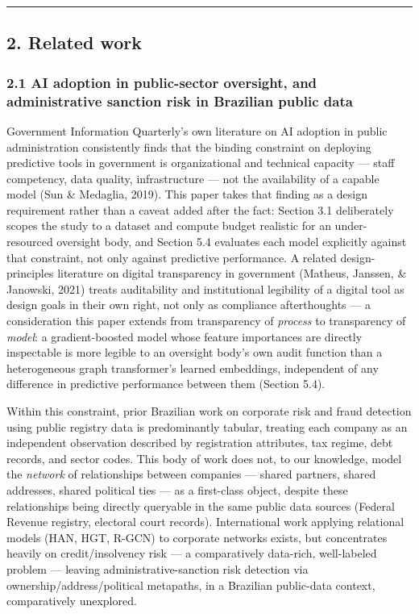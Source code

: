 \documentclass[11pt,]{article}
\begin{document}
\begin{center}\rule{0.5\linewidth}{0.5pt}\end{center}

\hypertarget{related-work}{%
\subsection{2. Related work}\label{related-work}}

\hypertarget{ai-adoption-in-public-sector-oversight-and-administrative-sanction-risk-in-brazilian-public-data}{%
\subsubsection{2.1 AI adoption in public-sector oversight, and
administrative sanction risk in Brazilian public
data}\label{ai-adoption-in-public-sector-oversight-and-administrative-sanction-risk-in-brazilian-public-data}}

Government Information Quarterly's own literature on AI adoption in
public administration consistently finds that the binding constraint on
deploying predictive tools in government is organizational and technical
capacity --- staff competency, data quality, infrastructure --- not the
availability of a capable model (Sun \& Medaglia, 2019). This paper
takes that finding as a design requirement rather than a caveat added
after the fact: Section 3.1 deliberately scopes the study to a dataset
and compute budget realistic for an under-resourced oversight body, and
Section 5.4 evaluates each model explicitly against that constraint, not
only against predictive performance. A related design-principles
literature on digital transparency in government (Matheus, Janssen, \&
Janowski, 2021) treats auditability and institutional legibility of a
digital tool as design goals in their own right, not only as compliance
afterthoughts --- a consideration this paper extends from transparency
of \emph{process} to transparency of \emph{model}: a gradient-boosted
model whose feature importances are directly inspectable is more legible
to an oversight body's own audit function than a heterogeneous graph
transformer's learned embeddings, independent of any difference in
predictive performance between them (Section 5.4).

Within this constraint, prior Brazilian work on corporate risk and fraud
detection using public registry data is predominantly tabular, treating
each company as an independent observation described by registration
attributes, tax regime, debt records, and sector codes. This body of
work does not, to our knowledge, model the \emph{network} of
relationships between companies --- shared partners, shared addresses,
shared political ties --- as a first-class object, despite these
relationships being directly queryable in the same public data sources
(Federal Revenue registry, electoral court records). International work
applying relational models (HAN, HGT, R-GCN) to corporate networks
exists, but concentrates heavily on credit/insolvency risk --- a
comparatively data-rich, well-labeled problem --- leaving
administrative-sanction risk detection via ownership/address/political
metapaths, in a Brazilian public-data context, comparatively unexplored.
\end{document}
